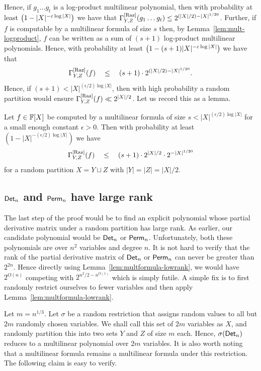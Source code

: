 \begin{sloppy}
	Hence, if $g_1\dots g_t$ is a log-product multilinear polynomial, 
	then with probability at least $\left(1 - |X|^{-\varepsilon \log |X|}\right)$ 
	we have that $\Gamma^{\mathrm{[Raz]}}_{Y,Z}(g_1\dots g_t) \leq 2^{(|X|/2) - |X|^{1/20}}$. 
	Further, if $f$ is computable by a multilinear formula of size $s$ then, 
	by Lemma~\ref{lem:mult-logproduct}, $f$ can be written as a sum of 
	$(s+1)$ log-product multilinear polynomials. Hence, with probability 
	at least $\left(1 - (s+1)|X|^{-\varepsilon \log |X|}\right)$ we have that
		$$\Gamma^{\mathrm{[Raz]}}_{Y,Z}(f) \quad \leq \quad (s+1) \cdot 2^{(|X|/2) - |X|^{1/20}}. $$
	Hence, if $(s+1) < |X|^{(\epsilon/2) \log |X|}$, then with high 
	probability a random partition would ensure 
	$\Gamma^{\mathrm{[Raz]}}_{Y,Z}(f) \ll 2^{|X|/2}$. Let us record this as a lemma.
\end{sloppy}

\begin{lemma}\label{lem:multformula-lowrank}
  Let $f \in \mathbb{F}[X]$ be computed by a multilinear formula of size $s < |X|^{(\epsilon/2) \log |X|}$ for a small enough constant $\epsilon > 0$. Then with probability at least $(1 - |X|^{-(\epsilon/2)\log |X|})$ we have $$\Gamma^{\mathrm{[Raz]}}_{Y,Z}(f) \quad \leq \quad (s+1)\cdot 2^{|X|/2} \cdot 2^{-|X|^{1/20}}$$ for a random partition $X = Y \sqcup Z$ with $|Y| = |Z| = |X|/2$.
\end{lemma}

\subsection{$\mathsf{Det}_n$ and $\mathsf{Perm}_n$ have large rank}

The last step of the proof would be to find an explicit polynomial whose partial derivative matrix under a random partition has large rank. As earlier, our candidate polynomial would be $\mathsf{Det}_n$ or $\mathsf{Perm}_n$. Unfortunately, both these polynomials are over $n^2$ variables and degree $n$. It is not hard to verify that the rank of the partial derivative matrix of $\mathsf{Det}_n$ or $\mathsf{Perm}_n$ can never be greater than $2^{2n}$. Hence directly using Lemma~\ref{lem:multformula-lowrank}, we would have $2^{O(n)}$ competing with $2^{n^2/2 - n^{O(1)}}$ which is simply futile. A simple fix is to first randomly restrict ourselves to fewer variables and then apply Lemma~\ref{lem:multformula-lowrank}. 

Let $m = n^{1/3}$. Let $\sigma$ be a random restriction that assigns random values to all but $2m$ randomly chosen variables. We shall call this set of $2m$ variables as $X$, and randomly partition this into two sets $Y$ and $Z$ of size $m$ each. Hence, $\sigma(\mathsf{Det}_n)$ reduces to a multilinear polynomial over $2m$ variables. It is also worth noting that a multilinear formula remains a multilinear formula under this restriction. The following claim is easy to verify. 

